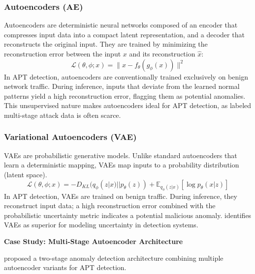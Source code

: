 \subsubsection{Autoencoders (AE)}
Autoencoders are deterministic neural networks composed of an encoder that compresses input data into a compact latent representation, and a decoder that reconstructs the original input. They are trained by minimizing the reconstruction error between the input $x$ and its reconstruction $\hat{x}$:
\begin{equation}
    \mathcal{L}(\theta, \phi; x) = \| x - f_\theta(g_\phi(x)) \|^2
\end{equation}
In APT detection, autoencoders are conventionally trained exclusively on benign network traffic. During inference, inputs that deviate from the learned normal patterns yield a high reconstruction error, flagging them as potential anomalies. This unsupervised nature makes autoencoders ideal for APT detection, as labeled multi-stage attack data is often scarce.

\subsubsection{Variational Autoencoders (VAE)}
VAEs are probabilistic generative models. Unlike standard autoencoders that learn a deterministic mapping, VAEs map inputs to a probability distribution (latent space). 
\begin{equation}
    \mathcal{L}(\theta, \phi; x) = -D_{KL}(q_\phi(z|x) || p_\theta(z)) + \mathbb{E}_{q_\phi(z|x)}[\log p_\theta(x|z)]
\end{equation}
In APT detection, VAEs are trained on benign traffic. During inference, they reconstruct input data; a high reconstruction error combined with the probabilistic uncertainty metric indicates a potential malicious anomaly. \cite{ankalaki2025cyber} identifies VAEs as superior for modeling uncertainty in detection systems.

\textbf{Case Study: Multi-Stage Autoencoder Architecture \cite{neuschmied2022apt}}

\cite{neuschmied2022apt} proposed a two-stage anomaly detection architecture combining multiple autoencoder variants for APT detection.

